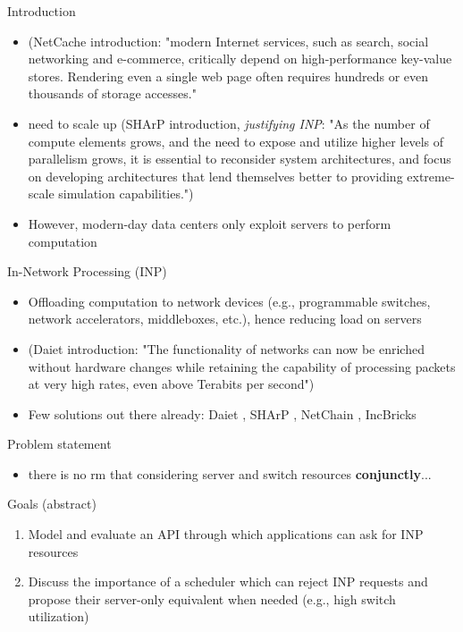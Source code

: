 \begin{frame}[fragile]{Introduction}
  \begin{itemize}
    \item (NetCache introduction: "modern Internet services, such as search, social networking and e-commerce, critically depend on high-performance key-value stores. Rendering even a single web page often requires hundreds or even thousands of storage accesses." \cite{netchain}
    \item need to scale up (SHArP introduction, \textit{justifying INP}: "As the number of compute elements grows, and the need to expose and utilize higher levels of parallelism grows, it is essential to reconsider system architectures, and focus on developing architectures that lend themselves better to providing extreme-scale simulation capabilities.") \cite{sharp}
    \item However, modern-day data centers only exploit servers to perform computation %
  \end{itemize}

\end{frame}
\begin{frame}[fragile]{In-Network Processing (INP)}
  \begin{itemize}
    \item Offloading computation to network devices (e.g., programmable switches, network accelerators, middleboxes, etc.), hence reducing load on servers
    \item (Daiet introduction: "The functionality of networks can now be enriched without hardware changes while retaining the capability of processing packets at very high rates, even above Terabits per second") \cite{daiet}
    \item Few solutions out there already: Daiet \cite{daiet}, SHArP \cite{sharp}, NetChain \cite{netchain}, IncBricks \cite{incbricks}
  \end{itemize}
\end{frame}
\begin{frame}[fragile]{Problem statement}
  \begin{itemize}
    \item there is no \gls{rm} that considering server and switch resources \textbf{conjunctly}...
  \end{itemize}
\end{frame}
\begin{frame}[fragile]{Goals}
  (abstract)
  \begin{enumerate}
    \item Model and evaluate an API through which applications can ask for INP resources
    \item Discuss the importance of a scheduler which can reject INP requests and propose their server-only equivalent when needed (e.g., high switch utilization)
  \end{enumerate}
\end{frame}

